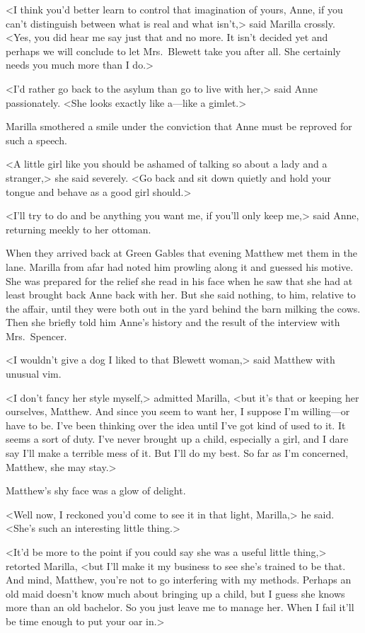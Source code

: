 <I think you'd better learn to control that imagination of yours, Anne, if you can't distinguish between what is real and what isn't,> said Marilla crossly. <Yes, you did hear me say just that and no more. It isn't decided yet and perhaps we will conclude to let Mrs.~Blewett take you after all. She certainly needs you much more than I do.>

<I'd rather go back to the asylum than go to live with her,> said Anne passionately. <She looks exactly like a—like a gimlet.>

Marilla smothered a smile under the conviction that Anne must be reproved for such a speech.

<A little girl like you should be ashamed of talking so about a lady and a stranger,> she said severely. <Go back and sit down quietly and hold your tongue and behave as a good girl should.>

<I'll try to do and be anything you want me, if you'll only keep me,> said Anne, returning meekly to her ottoman.

When they arrived back at Green Gables that evening Matthew met them in the lane. Marilla from afar had noted him prowling along it and guessed his motive. She was prepared for the relief she read in his face when he saw that she had at least brought back Anne back with her. But she said nothing, to him, relative to the affair, until they were both out in the yard behind the barn milking the cows. Then she briefly told him Anne's history and the result of the interview with Mrs.~Spencer.

<I wouldn't give a dog I liked to that Blewett woman,> said Matthew with unusual vim.

<I don't fancy her style myself,> admitted Marilla, <but it's that or keeping her ourselves, Matthew. And since you seem to want her, I suppose I'm willing—or have to be. I've been thinking over the idea until I've got kind of used to it. It seems a sort of duty. I've never brought up a child, especially a girl, and I dare say I'll make a terrible mess of it. But I'll do my best. So far as I'm concerned, Matthew, she may stay.>

Matthew's shy face was a glow of delight.

<Well now, I reckoned you'd come to see it in that light, Marilla,> he said. <She's such an interesting little thing.>

<It'd be more to the point if you could say she was a useful little thing,> retorted Marilla, <but I'll make it my business to see she's trained to be that. And mind, Matthew, you're not to go interfering with my methods. Perhaps an old maid doesn't know much about bringing up a child, but I guess she knows more than an old bachelor. So you just leave me to manage her. When I fail it'll be time enough to put your oar in.>

